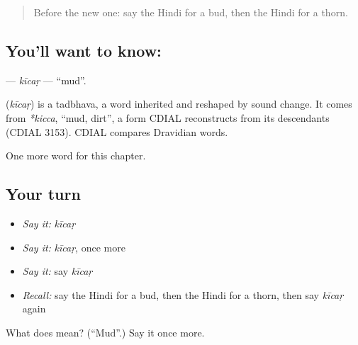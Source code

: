 \begin{quote}
Before the new one: say the Hindi for a bud, then the Hindi for a thorn.
\end{quote}

\subsection*{You'll want to know: }
\textbf{} — \emph{kīcaṛ} — \textquotedblleft{}mud\textquotedblright{}.

\begin{cousinweb}
\textbf{} (\emph{kīcaṛ}) is a tadbhava, a word inherited and reshaped by sound change. It comes from \emph{*kicca}, \textquotedblleft{}mud, dirt\textquotedblright{}, a form CDIAL reconstructs from its descendants (CDIAL 3153). CDIAL compares Dravidian words.
\end{cousinweb}

\begin{grammarlens}[title={What you've built}]
One more word for this chapter.
\end{grammarlens}

\subsection*{Your turn}
\begin{itemize}
\raggedright
  \item \emph{Say it:} \emph{kīcaṛ}
  \item \emph{Say it:} \emph{kīcaṛ}, once more
  \item \emph{Say it:} say \emph{kīcaṛ}
  \item \emph{Recall:} say the Hindi for a bud, then the Hindi for a thorn, then say \emph{kīcaṛ} again
\end{itemize}

\begin{tcolorbox}[breakable,colback=teal!4,colframe=teal!35!black,title={Before you move on}]
What does  mean? (\textquotedblleft{}Mud\textquotedblright{}.) Say it once more.
\end{tcolorbox}

